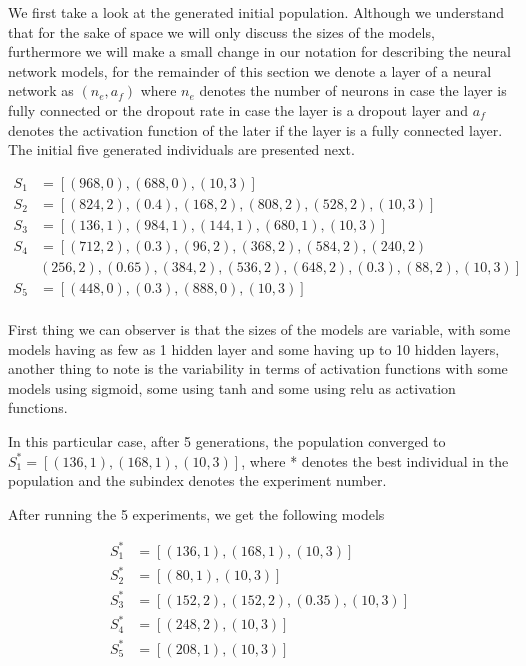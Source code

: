\documentclass[journal]{IEEEtran}
\begin{document}
We first take a look at the generated initial population. Although we understand that  for the sake of space we will only discuss the sizes of the models, furthermore we will make a small change in our notation for describing the neural network models, for the remainder of this section we denote a layer of a neural network as $(n_e, a_f)$ where $n_e$ denotes the number of neurons in case the layer is fully connected or the dropout rate in case the layer is a dropout layer and $a_f$ denotes the activation function of the later if the layer is a fully connected layer. The initial five generated individuals are presented next.

\begin{align*}
S_1 & = \left[ (968, 0), (688, 0), (10, 3) \right] \\
S_2 & = \left[ (824, 2), (0.4), (168, 2), (808, 2), (528, 2), (10, 3) \right] \\
S_3 & = \left[ (136, 1), (984, 1), (144, 1), (680, 1), (10, 3) \right] \\
S_4 & = \left[ (712, 2), (0.3), (96, 2), (368, 2), (584, 2), (240, 2) \right. \\
& \left. (256, 2), (0.65), (384, 2), (536, 2), (648, 2), (0.3), (88, 2), (10, 3) \right] \\
S_5 & = \left[ (448, 0), (0.3), (888, 0), (10, 3) \right] \\
\end{align*}

First thing we can observer is that the sizes of the models are variable, with some models having as few as 1 hidden layer and some having up to 10 hidden layers, another thing to note is the variability in terms of activation functions with some models using sigmoid, some using tanh and some using relu as activation functions.

In this particular case, after 5 generations, the population converged to $S^*_1 = \left[ (136, 1), (168,1), (10, 3) \right]$, where * denotes the best individual in the population and the subindex denotes the experiment number.

After running the 5 experiments, we get the following models

\begin{align*}
S^*_1 & = \left[ (136, 1), (168,1), (10, 3) \right] \\
S^*_2 & = \left[ (80, 1), (10, 3) \right] \\
S^*_3 & = \left[ (152, 2), (152, 2), (0.35), (10, 3) \right] \\
S^*_4 & = \left[ (248, 2),  (10, 3) \right] \\
S^*_5 & = \left[ (208, 1),  (10, 3) \right] \\
\end{align*}
\end{document}
